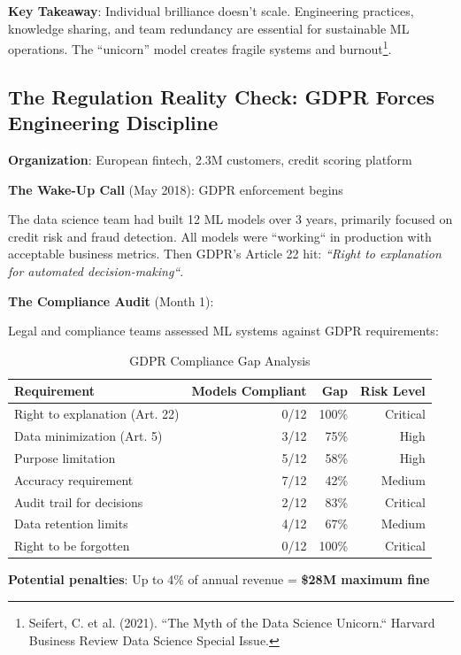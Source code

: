 \textbf{Key Takeaway}: Individual brilliance doesn't scale. Engineering practices, knowledge sharing, and team redundancy are essential for sustainable ML operations. The ``unicorn'' model creates fragile systems and burnout\footnote{Seifert, C. et al. (2021). ``The Myth of the Data Science Unicorn.`` Harvard Business Review Data Science Special Issue.}.

\subsection{The Regulation Reality Check: GDPR Forces Engineering Discipline}

\textbf{Organization}: European fintech, 2.3M customers, credit scoring platform

\textbf{The Wake-Up Call} (May 2018): GDPR enforcement begins

The data science team had built 12 ML models over 3 years, primarily focused on credit risk and fraud detection. All models were ``working`` in production with acceptable business metrics. Then GDPR's Article 22 hit: \textit{``Right to explanation for automated decision-making``}.

\textbf{The Compliance Audit} (Month 1):

Legal and compliance teams assessed ML systems against GDPR requirements:

\begin{table}[h]
\centering
\caption{GDPR Compliance Gap Analysis}
\begin{tabular}{lrrr}
\toprule
\textbf{Requirement} & \textbf{Models Compliant} & \textbf{Gap} & \textbf{Risk Level} \\
\midrule
Right to explanation (Art. 22) & 0/12 & 100\% & Critical \\
Data minimization (Art. 5) & 3/12 & 75\% & High \\
Purpose limitation & 5/12 & 58\% & High \\
Accuracy requirement & 7/12 & 42\% & Medium \\
Audit trail for decisions & 2/12 & 83\% & Critical \\
Data retention limits & 4/12 & 67\% & Medium \\
Right to be forgotten & 0/12 & 100\% & Critical \\
\bottomrule
\end{tabular}
\end{table}

\textbf{Potential penalties}: Up to 4\% of annual revenue = \textbf{\$28M maximum fine}

